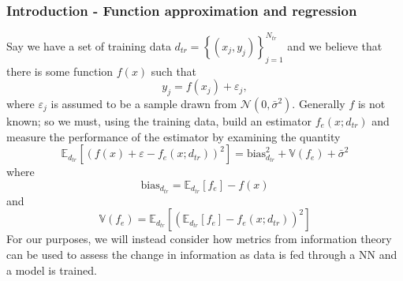 \documentclass[11pt,aspectratio=169]{beamer}
\newcommand{\parens}[1]{\left(#1\right)}
\newcommand{\bracks}[1]{\left\{#1\right\}}
\newcommand{\sqbracks}[1]{\left[#1\right]}
\newcommand{\vep}{\varepsilon}
\begin{document}
    \begin{frame}
        \frametitle{Introduction - Function approximation and regression}
        Say we have a set of training data $d_{tr} = \bracks{(x_j, y_j)}_{j=1}^{N_{tr}}$ 
        and we believe that there is some function $f(x)$ such that 
        \begin{equation}
            y_j = f(x_j) + \vep_j,    
        \end{equation}
        where $\vep_j$ is assumed to be a sample drawn from $\mathcal{N}(0, \bar{\sigma}^2)$. 
        \cite{oreilly, theodoridis}
        Generally $f$ is not known; so we must, using the training data, build an estimator 
        $f_e(x; d_{tr})$ and measure the performance of the estimator by examining the quantity
        \begin{equation}
            \mathbb{E}_{d_{tr}}\sqbracks{\parens{f(x) + \vep - f_e(x;d_{tr})}^2} = 
            \text{bias}_{d_{tr}}^2 + \mathbb{V}(f_e) + \bar{\sigma}^2
        \end{equation}
        where 
        \begin{equation}
            \text{bias}_{d_{tr}} = \mathbb{E}_{d_{tr}}\sqbracks{f_e} - f(x)
        \end{equation}
        and 
        \begin{equation}
            \mathbb{V}(f_e) = \mathbb{E}_{d_{tr}}\sqbracks{\parens{\mathbb{E}_{d_{tr}}
            \sqbracks{f_e} - f_e(x; d_{tr})}^2}
        \end{equation}
        For our purposes, 
        we will instead consider how metrics from information theory can be used to assess the change in 
        information as data is fed through a NN and a model is trained.
    \end{frame}
\end{document}

